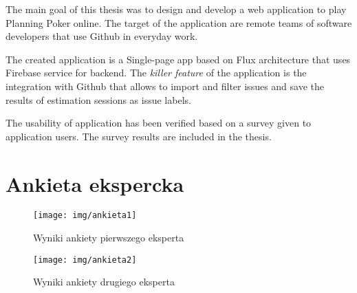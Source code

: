 \documentclass[inzynier,druk]{dyplom}
\begin{document}
The main goal of this thesis was to design and develop a web application to play
Planning Poker online. The target of the application are remote teams of software
developers that use Github in everyday work.

The created application is a Single-page app based on Flux architecture
that uses Firebase service for backend.
The \textit{killer feature} of the application is the integration with
Github that allows to import and filter issues and save the results of
estimation sessions as issue labels.

The usability of application has been verified based on a survey given to
application users. The survey results are included in the thesis.
\endgroup
{}
























\appendixpage
\appendix

\chapter{Ankieta ekspercka}\label{Dod1}

\begin{figure}
	\centering\texttt{[image: img/ankieta1]}
	\caption{Wyniki ankiety pierwszego eksperta}\label{rys:ankieta1}%
\end{figure}

\begin{figure}
	\centering\texttt{[image: img/ankieta2]}
	\caption{Wyniki ankiety drugiego eksperta}\label{rys:ankieta2}%
\end{figure}
\end{document}
